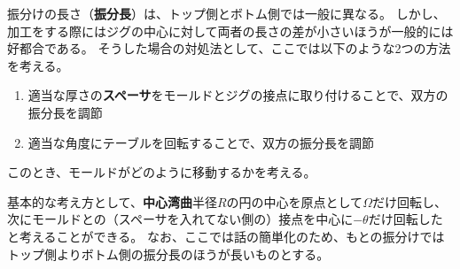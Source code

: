 


振分けの長さ（\textbf{振分長}）は、トップ側とボトム側では一般に異なる。
しかし、加工をする際にはジグの中心に対して両者の長さの差が小さいほうが一般的には好都合である。
そうした場合の対処法として、ここでは以下のような2つの方法を考える。
\begin{enumerate}
\item
適当な厚さの\textbf{スペーサ}をモールドとジグの接点に取り付けることで、双方の振分長を調節
\item
適当な角度にテーブルを回転することで、双方の振分長を調節
\end{enumerate}
このとき、モールドがどのように移動するかを考える。

基本的な考え方として、\textbf{中心湾曲}半径$R$の円の中心を原点として$\Omega$だけ回転し、次にモールドとの（スペーサを入れてない側の）接点を中心に$-\theta$だけ回転したと考えることができる。
なお、ここでは話の簡単化のため、もとの振分けではトップ側よりボトム側の振分長のほうが長いものとする。




